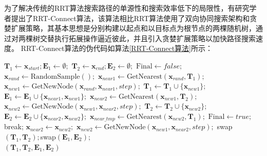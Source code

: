 为了解决传统的RRT算法搜索路径的单源性和搜索效率低下的局限性，有研究学者提出了RRT-Connect算法，该算法相比RRT算法使用了双向协同搜索架构和贪婪扩展策略，其基本思想是分别构建以起点和以目标点为根节点的两棵随机树，通过对两棵树交替执行拓展操作逼近彼此，并且引入贪婪扩展策略以加快路径搜索速度。
RRT-Connect算法的伪代码如算法\ref{RRT-Connect算法}所示：
\begin{algorithm}
    \caption{RRT-Connect算法}
    \label{RRT-Connect算法}
    \begin{algorithmic}[1]
        \setlength{\baselineskip}{16pt}
        \State $\boldsymbol{T}_1\leftarrow\boldsymbol{x}_{start};\boldsymbol{E}_1\leftarrow\emptyset;$
        \State $\boldsymbol{T}_2\leftarrow\boldsymbol{x}_{end};\boldsymbol{E}_2\leftarrow\emptyset;$
        \State $\text{Final} \gets false ;$
            \State $\boldsymbol{x}_{rand}\gets\text{RandomSample}();$
            \State $\boldsymbol{x}_{near1}\gets\text{GetNearest}(\boldsymbol{x}_{rand},\boldsymbol{T}_1);$
            \State $\boldsymbol{x}_{new1}\gets\text{GetNewNode}(\boldsymbol{x}_{rand},\boldsymbol{x}_{near1},step);$
                \State $\boldsymbol{T}_1\leftarrow \boldsymbol{T}_1\cup\{\boldsymbol{x}_{new1}\};$
                $\boldsymbol{E}_1\leftarrow \boldsymbol{E}_1\cup\{\boldsymbol{x}_{near1},\boldsymbol{x}_{new1}\};$
                \State $\boldsymbol{x}_{near2}\gets\text{GetNearest}(\boldsymbol{x}_{new1},\boldsymbol{T}_2);$
                \State $\boldsymbol{x}_{new2}\gets\text{GetNewNode}(\boldsymbol{x}_{new1},\boldsymbol{x}_{near2},step);$
                \State $\boldsymbol{T}_2\leftarrow \boldsymbol{T}_2\cup\{\boldsymbol{x}_{new2}\};$
                $\boldsymbol{E}_2\leftarrow \boldsymbol{E}_2\cup\{\boldsymbol{x}_{near2},\boldsymbol{x}_{new2}\};$
                \State $\boldsymbol{x}_{near\_tmp}\gets\text{GetNearest}(\boldsymbol{x}_{new2},\boldsymbol{T}_1);$
                    \State $\text{Final} \gets true ;$
                    \State break;
                \EndIf
                \State $\boldsymbol{x}_{near2}\gets\boldsymbol{x}_{new2};$
                \State $\boldsymbol{x}_{new2}\gets\text{GetNewNode}(\boldsymbol{x}_{new1},\boldsymbol{x}_{near2},step);$
                \EndWhile
                \State swap$(\boldsymbol{T}_1,\boldsymbol{T}_2);$swap$(\boldsymbol{E}_1,\boldsymbol{E}_2);$
            \EndIf
        \EndWhile \\
        \Return $(\boldsymbol{T}_1,\boldsymbol{T}_2,\boldsymbol{E}_1,\boldsymbol{E}_2)$
\end{algorithmic}
\end{algorithm}

